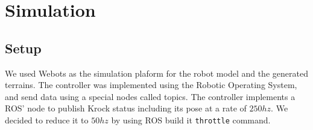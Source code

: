 \documentclass[../document.tex]{subfiles}
\begin{document}


\section{Simulation}
\subsection{Setup}
We used Webots as the simulation plaform for the robot model and the generated terrains. The controller was implemented using the Robotic Operating System, and send data using a special nodes called topics. The controller implements a ROS' node to publish Krock status including its pose at a rate of $250hz$. We decided to reduce it to $50hz$ by using ROS build it \texttt{throttle} command. 
\end{document}
